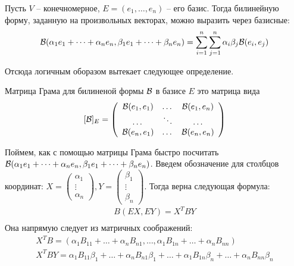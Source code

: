 \vspace*{5mm}

Пусть $V$ -- конечномерное, $E = (e_1, \dots, e_n)$ -- его базис.
Тогда билинейную форму, заданную на произвольных векторах, можно выразить через базисные: 
\[ \mathcal{B}(\alpha_1 e_1 + \dots + \alpha_n e_n, \beta_1 e_1 + \dots + \beta_n e_n) = 
\sum_{i=1}^{n} \sum_{j = 1}^{n} \alpha_i \beta_j \mathcal{B}(e_i, e_j) \]

Отсюда логичным оборазом вытекает следующее определение.

\begin{conj} Матрица Грама для билиненой формы $\mathcal{B}$ в базисе $E$ это матрица вида
\[ [\mathcal{B}]_E = \left(\begin{array}{ccc}
\mathcal{B}(e_1, e_1) & \dots & \mathcal{B}(e_1, e_n) \\ 
\dots & \ddots & \dots \\ 
\mathcal{B}(e_n, e_1) & \dots & \mathcal{B}(e_n, e_n)
\end{array}\right) \] 
\end{conj}

\vspace*{5mm}

Поймем, как с помощью матрицы Грама быстро посчитать $\mathcal{B}(\alpha_1 e_1 + \dots + \alpha_n e_n, \beta_1 e_1 + \dots + \beta_n e_n)$. 
Введем обозначение для столбцов координат: $X = \begin{pmatrix}
    \alpha_1 \\
    \vdots \\
    \alpha_n
\end{pmatrix}, Y = \begin{pmatrix}
    \beta_1 \\
    \vdots \\
    \beta_n
\end{pmatrix}$. 
Тогда верна следующая формула: \begin{gather*}
    B(EX, EY) = X^TBY \\
\end{gather*}
Она напрямую следует из матричных соображений: \begin{gather*}
    X^TB = (\alpha_1 B_{11} + \dots + \alpha_n B_{n1}, \dots, \alpha_1 B_{1n} + \dots + \alpha_n B_{nn}) \\
    X^TBY = \alpha_1 B_{11}\beta_1 + \dots + \alpha_n B_{n1}\beta_1 + \dots + \alpha_1 B_{1n}\beta_n + \dots + \alpha_n B_{nn}\beta_n 
\end{gather*}

\vspace*{5mm}


